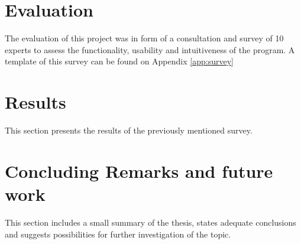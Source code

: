\documentclass[12pt]{extarticle}
\begin{document}
\section{Evaluation} \label{sec:Eval}
The evaluation of this project was in form of a consultation and survey of 10 experts  to assess the functionality, usability and intuitiveness of the program. A template of this survey can be found on Appendix \ref{app:survey}\cite{QDsus}

\section{Results}\label{sec:Res}
This section presents the results of the previously mentioned survey.

\section{Concluding Remarks and future work}\label{sec:Con}
This section includes a small summary of the thesis, states adequate conclusions and suggests possibilities for further investigation of the topic.


\pagebreak
\end{document}
